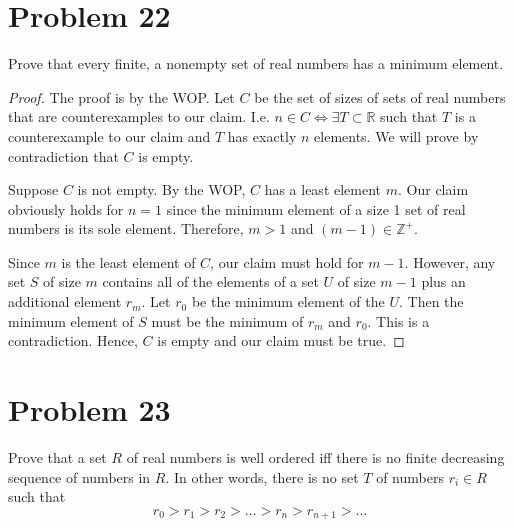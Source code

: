\documentclass{article}
\begin{document}
\pagebreak

\section{Problem 22}
Prove that every finite, a nonempty set of real numbers has a minimum element.
\begin{proof}
	The proof is by the WOP. Let $C$ be the set of sizes of sets of real numbers that are counterexamples to our claim. I.e. $n \in C \iff \exists T \subset \mathbb{R}$ such that $T$ is a counterexample to our claim and $T$ has exactly $n$ elements.  We will prove by contradiction that $C$ is empty.

	Suppose $C$ is not empty. By the WOP, $C$ has a least element $m$. Our claim obviously holds for $n = 1$ since the minimum element of a size 1 set of real numbers is its sole element. Therefore, $m > 1$ and $(m - 1) \in \mathbb{Z^+}$.

	Since $m$ is the least element of $C$, our claim must hold for $m - 1$.  However, any set $S$ of size $m$ contains all of the elements of a set $U$ of size $m - 1$ plus an additional element $r_m$. Let $r_0$ be the minimum element of the $U$.  Then the minimum element of $S$ must be the minimum of $r_m$ and $r_0$. This is a contradiction. Hence, $C$ is empty and our claim must be true.
\end{proof}

\pagebreak

\section{Problem 23}
Prove that a set $R$ of real numbers is well ordered iff there is no finite decreasing sequence of numbers in $R$. In other words, there is no set $T$ of numbers $r_i \in R$ such that
\begin{equation}\label{p23decreasing}
	r_0 > r_1 > r_2 > ... > r_n > r_{n+1} > ...
\end{equation}
\end{document}
